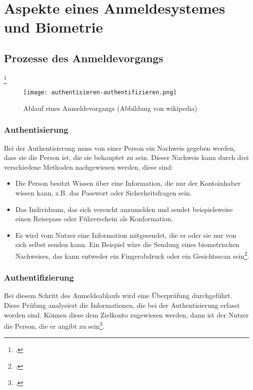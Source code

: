 \chapter{Aspekte eines Anmeldesystemes und Biometrie}
\strahlhofer

\section{Prozesse des Anmeldevorgangs}\footcite{authentifizierung}
\begin{center}
\begin{figure}[h]
    \centering
    \texttt{[image: authentisieren-authentifizieren.png]}
    \caption{Ablauf eines Anmeldevorgangs (Abbildung von wikipedia)}
\end{figure}
\end{center}

\subsection{Authentisierung} 
Bei der Authentisierung muss von einer Person ein Nachweis gegeben werden, dass sie die Person ist, die sie behauptet zu sein. Dieser Nachweis kann durch drei verschiedene Methoden nachgewiesen werden, diese sind:
\begin{itemize}
	\item Die Person besitzt Wissen über eine Information, die nur der Kontoinhaber wissen kann, z.B. das Passwort oder Sicherheitsfragen sein.
	\item Das Individuum, das sich versucht anzumelden und sendet beispielsweise einen Reisepass oder Führerschein als Konformation.
	\item Es wird vom Nutzer eine Information mitgesendet, die er oder sie nur von sich selbst senden kann. Ein Beispiel wäre die Sendung eines biometrischen Nachweises, das kann entweder ein Fingerabdruck oder ein Gesichtsscan sein\footcite{anmeldevorgangs}.
\end{itemize}

\subsection{Authentifizierung}
Bei diesem Schritt des Anmeldeablaufs wird eine Überprüfung durchgeführt. Diese Prüfung analysiert die Informationen, die bei der Authentisierung erfasst worden sind. Können diese dem Zielkonto zugewiesen werden, dann ist der Nutzer die Person, die er angibt zu sein\footcite{anmeldevorgangs}.

